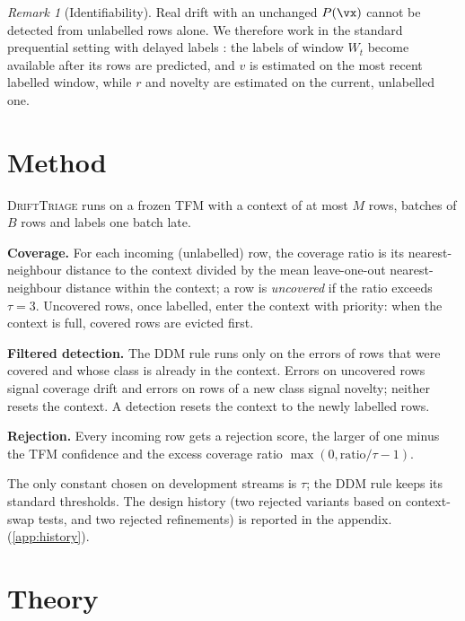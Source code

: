 \documentclass{article}
\theoremstyle{plain}
\theoremstyle{definition}
\theoremstyle{remark}
\newtheorem{remark}{Remark}
\newcommand{\method}{\textsc{DriftTriage}}   %
\begin{document}
\begin{remark}[Identifiability]
Real drift with an unchanged $P(\vx)$ cannot be detected from unlabelled rows alone. We therefore work in the standard
prequential setting with delayed labels \citep{gama2014survey}: the labels of window $W_t$ become available after its
rows are predicted, and $v$ is estimated on the most recent labelled window, while $r$ and novelty are estimated on
the current, unlabelled one. 
\end{remark}

\section{Method}
\label{sec:method}

\method{} runs on a frozen TFM with a context of at most $M$ rows, batches of $B$ rows and labels one batch late.

\textbf{Coverage.} For each incoming (unlabelled) row, the coverage ratio is its nearest-neighbour distance to the
context divided by the mean leave-one-out nearest-neighbour distance within the context; a row is \emph{uncovered} if
the ratio exceeds $\tau=3$. Uncovered rows, once labelled, enter the context with priority: when the context is full,
covered rows are evicted first.

\textbf{Filtered detection.} The DDM rule \citep{gama2014survey} runs only on the errors of rows that were covered and
whose class is already in the context. Errors on uncovered rows signal coverage drift and errors on rows of a new
class signal novelty; neither resets the context. A detection resets the context to the newly labelled rows.

\textbf{Rejection.} Every incoming row gets a rejection score, the larger of one minus the TFM confidence and the
excess coverage ratio $\max(0,\text{ratio}/\tau-1)$.

The only constant chosen on development streams is $\tau$; the DDM rule keeps its standard thresholds. The design
history (two rejected variants based on context-swap tests, and two rejected refinements) is reported in the appendix.
(\cref{app:history}).

\section{Theory}
\label{sec:theory}
\end{document}
